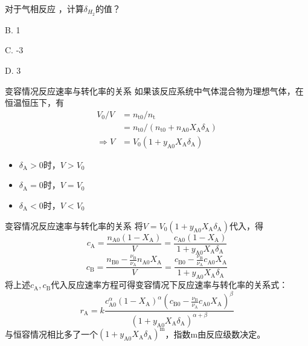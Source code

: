 \begin{frame}[t]
    \frametitle{}
    \begin{question}
        对于气相反应 ，计算$\delta_{H_2}$的值？
        \tcblower

        B. 1

        C. -3

        D. 3
    \end{question}
\end{frame}


\begin{frame}{变容情况反应速率与转化率的关系}
    如果该反应系统中气体混合物为理想气体，在恒温恒压下，有
    \[
        \begin{aligned}
             V_0/V&=n_\mathrm{t0}/n_\mathrm{t}\\
             &=n_\mathrm{t0}/(n_\mathrm{t0}+n_\mathrm{A0}X_\mathrm{A}\delta_\mathrm{A})\\
             \Longrightarrow V&=V_0(1+y_\mathrm{A0}X_\mathrm{A}\delta_\mathrm{A})
        \end{aligned}
    \]
    \begin{itemize}
      \item $\delta_\mathrm{A}>0$时，$V>V_0$
      \item $\delta_\mathrm{A}=0$时，$V=V_0$
      \item $\delta_\mathrm{A}<0$时，$V<V_0$
    \end{itemize}
\end{frame}


\begin{frame}{变容情况反应速率与转化率的关系}
    将$V=V_0(1+y_\mathrm{A0}X_\mathrm{A}\delta_\mathrm{A})$代入，得
    \[
        c_\mathrm{A}=\frac{n_\mathrm{A0}(1-X_\mathrm{A})}{V}=\frac{c_\mathrm{A0}(1-X_\mathrm{A})}{1+y_\mathrm{A0}X_\mathrm{A}\delta_\mathrm{A}}
    \]
    \[
        c_\mathrm{B}=\frac{n_\mathrm{B0}-\frac{\nu_\mathrm{B}}{\nu_\mathrm{A}}n_\mathrm{A0}X_\mathrm{A}}{V}=\frac{c_\mathrm{B0}-\frac{\nu_\mathrm{B}}{\nu_\mathrm{A}}c_\mathrm{A0}X_\mathrm{A}}{1+y_\mathrm{A0}X_\mathrm{A}\delta_\mathrm{A}}
    \]
    将上述$c_\mathrm{A},c_\mathrm{B}$代入反应速率方程可得变容情况下反应速率与转化率的关系式：
    \[
        r_\mathrm{A}=k\frac{c_\mathrm{A0}^\alpha(1-X_\mathrm{A})^\alpha (c_\mathrm{B0}-\frac{\nu_\mathrm{B}}{\nu_\mathrm{A}}c_\mathrm{A0}X_\mathrm{A})^\beta}{(1+y_\mathrm{A0}X_\mathrm{A}\delta_\mathrm{A})^{\alpha+\beta}}
    \]
    与恒容情况相比多了一个$(1+y_\mathrm{A0}X_\mathrm{A}\delta_\mathrm{A})^\mathrm{m}$，指数m由反应级数决定。
\end{frame}


